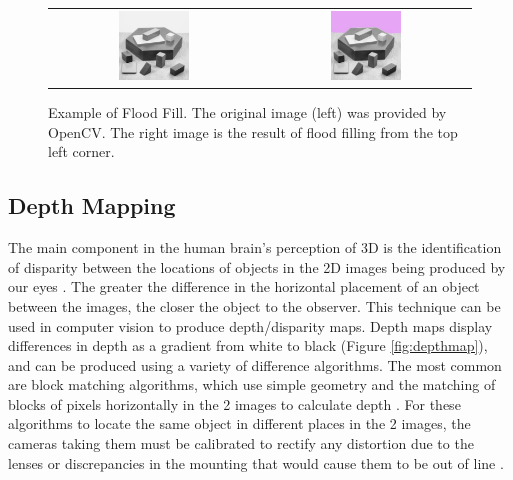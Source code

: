 \begin{figure}[H]
    \begin{center}
    \begin{tabular}{ c c }
        \includegraphics[width=0.35\textwidth]{Figures/blox.jpg} &
        \includegraphics[width=0.35\textwidth]{Figures/bloxFilled.jpg}
    \end{tabular}
    \caption[Example of Flood Fill]{Example of Flood Fill. The original image (left) was provided by OpenCV. The right image is the result of flood filling from the top left corner.}
    \label{fig:EgFloodFill}
    \end{center}
\end{figure}

\subsection{Depth Mapping}
\label{subsection:depth}

The main component in the human brain's perception of 3D is the identification of disparity between the locations of objects in the 2D images being produced by our eyes \cite{qian1997binocular}. The greater the difference in the horizontal placement of an object between the images, the closer the object to the observer. This technique can be used in computer vision to produce depth/disparity maps. Depth maps display differences in depth as a gradient from white to black (Figure \ref{fig:depthmap}), and can be produced using a variety of difference algorithms. The most common are block matching algorithms, which use simple geometry and the matching of blocks of pixels horizontally in the 2 images to calculate depth \cite{linda2001stockman}. For these algorithms to locate the same object in different places in the 2 images, the cameras taking them must be calibrated to rectify any distortion due to the lenses \cite{distort} or discrepancies in the mounting that would cause them to be out of line \cite{stereocal}.

